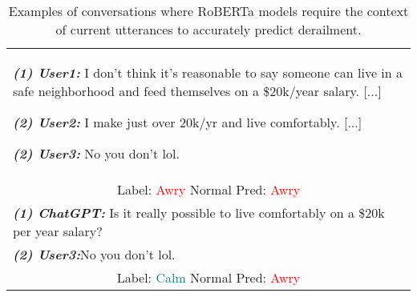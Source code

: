 \begin{table}[ht]
    \renewcommand{\arraystretch}{1.0}
        \begin{tabularx}{\linewidth}{|X|}
            \hline
            \textbf{\textit{(1) User1:}} I don't think it's reasonable to say someone can live in a safe neighborhood and feed themselves on a \$20k/year salary. [...]
    
            \textbf{\textit{(2) User2:}} I make just over 20k/yr and live comfortably. [...]
            
            \textbf{\textit{(2) User3:}} No you don't lol.
            \\
            \multicolumn{1}{|c|}{Label: \textcolor{red}{Awry}\quad        
            Normal Pred: \textcolor{red}{Awry}}\\
            
            \hline
    
           \textbf{\textit{(1) ChatGPT:}} Is it really possible to live comfortably on a \$20k per year salary?
           \\
            \textbf{\textit{(2) User3:}}No you don't lol.
            \\ \multicolumn{1}{|c|}{Label: \textcolor{teal}{Calm}\quad
            Normal Pred: \textcolor{red}{Awry}}
            \\
            
            \hline
    
        \end{tabularx}
    
    \caption{Examples of conversations where RoBERTa models require the context of current utterances to accurately predict derailment.}
    \label{tab:trama-example}
    \end{table}